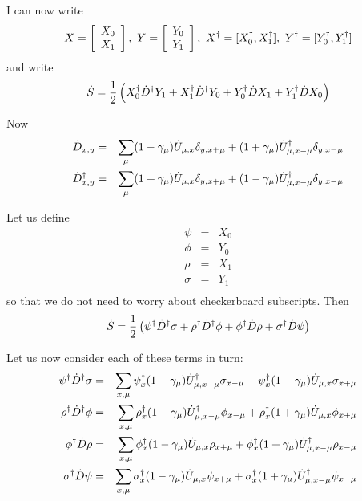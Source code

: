 \documentclass[12pt]{article}
\begin{document}
I can now write 
\begin{equation}
X = \left[ \begin{array}{c} X_0 \\ X_1 \end{array} \right],\ Y = \left[ \begin{array}{c} Y_0 \\ Y_1 \end{array} \right],\ X^{\dagger} = [ X^{\dagger}_0, X^{\dagger}_1 ], \ Y^{\dagger} = [ Y^{\dagger}_0, Y^{\dagger}_1 ]
\end{equation}
and write 
\begin{equation}
\dot{S} = \frac{1}{2} \left( X^{\dagger}_0 \dot{D}^{\dagger} Y_1 + X^{\dagger}_1 \dot{D}^{\dagger} Y_0 + Y^{\dagger}_0 \dot{D} X_1 + Y^{\dagger}_1 \dot{D} X_0 \right)
\end{equation}

Now
\begin{eqnarray}
\dot{D}_{x,y}&=&\sum_{\mu} (1 - \gamma_{\mu}) \dot{U}_{\mu,x} \delta_{y,x+\mu} + (1 + \gamma_{\mu}) \dot{U}^{\dagger}_{\mu,x-\mu} \delta_{y,x-\mu} \label{e:Ddot}\\
\dot{D}^{\dagger}_{x,y} &=& \sum_{\mu} (1 + \gamma_{\mu}) \dot{U}_{\mu,x} \delta_{y,x+\mu} +  (1 - \gamma_{\mu}) \dot{U}^{\dagger}_{\mu,x-\mu} \delta_{y,x-\mu} \label{e:DdagDot}
\end{eqnarray}

Let us define 
\begin{eqnarray} 
\psi &=& X_0 \\
\phi &=& Y_0 \\
\rho &=& X_1 \\
\sigma   &=& Y_1 \\
\end{eqnarray}
so that we do not need to worry about checkerboard subscripts.
Then 
\begin{equation}
\dot{S} = \frac{1}{2} \left( \psi^{\dagger} \dot{D}^{\dagger} \sigma + \rho^{\dagger} \dot{D}^{\dagger} \phi + \phi^{\dagger} \dot{D} \rho + \sigma^{\dagger} \dot{D} \psi \right) \label{e:Ssigmasig}
\end{equation}

Let us now consider each of these terms in turn:
\begin{eqnarray}
\psidag \DdagDot \sigma &=& \sum_{x,\mu}  \psidag_{x} \onemgm \UdagDot_{\mu, x-\mu} \sigma_{x-\mu} +\psidag_{x} \onepgm \Udot_{\mu,x} \sigma_{x+\mu} \\
%
\rhodag \DdagDot \phi &=& \sum_{x,\mu}  \rhodag_{x} \onemgm \UdagDot_{\mu, x-\mu} \phi_{x-\mu} +\rhodag_{x} \onepgm \Udot_{\mu,x} \phi_{x+\mu}  \\
%
\phidag \Ddot \rho &=& \sum_{x,\mu} \phidag_x \onemgm \Udot_{\mu,x} \rho_{x+\mu} + \phidag_{x} \onepgm \UdagDot_{\mu, x-\mu} \rho_{x-\mu} \\
%
\sigmadag \Ddot \psi &=&  \sum_{x,\mu} \sigmadag_x \onemgm \Udot_{\mu,x} \psi_{x+\mu} + \sigmadag_{x} \onepgm \UdagDot_{\mu, x-\mu} \psi_{x-\mu} \\
\end{eqnarray}
\end{document}
